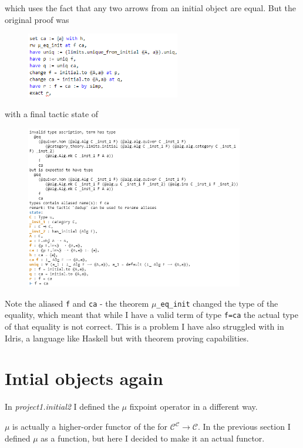 \documentclass[a4paper, twoside, 11pt]{article}
\theoremstyle{definition}
\theoremstyle{plain}
\theoremstyle{remark}
\newcommand{\cat}[1]{\mathcal{#1}}
\begin{document}
which uses the fact that any two arrows from an initial object are equal. But the original proof was

\begin{figure}[htpb]
    \includegraphics[width=0.6\textwidth]{pic2.png}
\end{figure}

with a final tactic state of

\newpage

\begin{figure}[htpb]
    \includegraphics[width=0.85\textwidth]{pic3.png}
\end{figure}

Note the aliased \texttt{f} and \texttt{ca} - the theorem $\mu$\texttt{\_eq\_init} changed the type of the equality, which meant that while I have a valid term of type \texttt{f=ca} the actual type of that equality is not correct. This is a problem I have also struggled with in Idris, a language like Haskell but with theorem proving capabilities.


\section{Intial objects again}

In \emph{project1.initial2} I defined the $\mu$ fixpoint operator in a different way.

$\mu$ is actually a higher-order functor of the for $\cat{C}^{\cat{C}} \to \cat{C}$. In the previous section I defined $\mu$ as a function, but here I decided to make it an actual functor.
\end{document}
